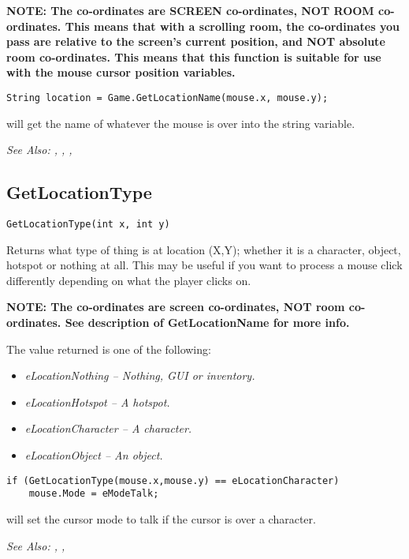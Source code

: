 \bf{NOTE:} The co-ordinates are SCREEN co-ordinates, NOT ROOM co-ordinates. This
means that with a scrolling room, the co-ordinates you pass are relative to
the screen's current position, and NOT absolute room co-ordinates. This
means that this function is suitable for use with the mouse cursor position
variables.

\begin{verbatim}
String location = Game.GetLocationName(mouse.x, mouse.y);
\end{verbatim}
will get the name of whatever the mouse is over into the string variable.

\it{See Also:} , ,
, 


\subsection{GetLocationType}\label{GetLocationType}%

\begin{verbatim}
GetLocationType(int x, int y)
\end{verbatim}
Returns what type of thing is at location (X,Y); whether it is a character,
object, hotspot or nothing at all. This may be useful if you want to
process a mouse click differently depending on what the player clicks on.

\bf{NOTE:} The co-ordinates are screen co-ordinates, NOT room co-ordinates. See
description of GetLocationName for more info.

The value returned is one of the following:
\begin{itemize}
\item \it{eLocationNothing} -- Nothing, GUI or inventory.
\item \it{eLocationHotspot} -- A hotspot.
\item \it{eLocationCharacter} -- A character.
\item \it{eLocationObject} -- An object.
\end{itemize}

\begin{verbatim}
if (GetLocationType(mouse.x,mouse.y) == eLocationCharacter)
    mouse.Mode = eModeTalk;
\end{verbatim}
will set the cursor mode to talk if the cursor is over a character.

\it{See Also:} ,
,


